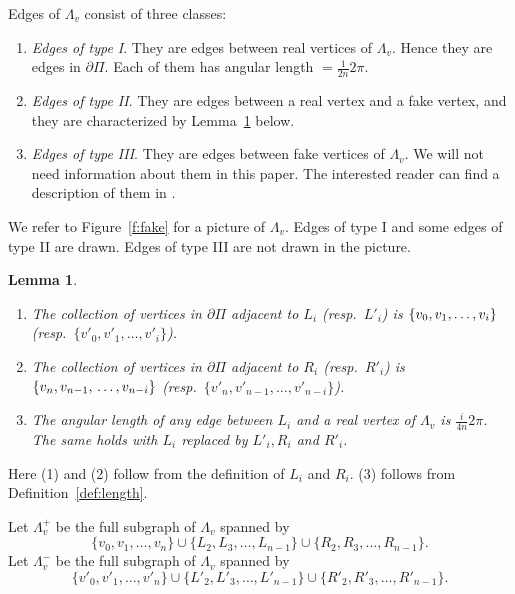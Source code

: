 \documentclass[11pt]{amsart}
\newtheorem{lemma}[theorem]{Lemma}
\theoremstyle{definition}
\newcommand{\lemfivefourteen}{Lemma 5.13}
\begin{document}
Edges of $\Lambda_v$ consist of three classes:
\begin{enumerate}
	\item \emph{Edges of type I}. They are edges between real vertices of $\Lambda_v$. Hence they are edges in $\partial\Pi$. Each of them has angular length $=\frac{1}{2n}2\pi$.
	\item \emph{Edges of type II}. They are edges between a real vertex and a fake vertex, and they are characterized by Lemma~\ref{lem:real fake} below.
	\item \emph{Edges of type III}. They are edges between fake vertices of $\Lambda_v$. We will not need information about them in this paper. The interested reader can find a description of them in \cite[\lemfivefourteen]{Artinmetric}.
\end{enumerate}
We refer to Figure~\ref{f:fake} for a picture of $\Lambda_v$. Edges of type I and some edges of type II are drawn. Edges of type III are not drawn in the picture.


\begin{lemma}\
	\label{lem:real fake}
	\begin{enumerate}
		\item The collection of vertices in $\partial\Pi$ adjacent to $L_i$ (resp.\ $L'_i$) is $\{v_0,v_1,\ldots,\\v_i\}$ (resp.\ $\{v'_0,v'_1,\ldots,v'_i\}$). 
		\item The collection of vertices in $\partial\Pi$ adjacent to $R_i$ (resp.\ $R'_i$) is $\{v_n,v_{n-1},\\ \ldots,v_{n-i}\}$ (resp.\ $\{v'_n,v'_{n-1},\ldots,v'_{n-i}\}$). 
		\item The angular length of any edge between $L_i$ and a real vertex of $\Lambda_v$ is $\frac{i}{4n}2\pi$. The same holds with $L_i$ replaced by $L'_i,R_i$ and $R'_i$.
	\end{enumerate}
\end{lemma}

Here (1) and (2) follow from the definition of $L_i$ and $R_i$. (3) follows from Definition~\ref{def:length}.

Let $\Lambda^+_v$ be the full subgraph of $\Lambda_v$ spanned by $$\{v_0,v_1,\ldots,v_n\}\cup \{L_2,L_3,\ldots,L_{n-1}\}\cup \{R_2,R_3,\ldots,R_{n-1}\}.$$ Let $\Lambda^-_v$ be the full subgraph of $\Lambda_v$ spanned by $$\{v'_0,v'_1,\ldots,v'_n\}\cup \{L'_2,L'_3,\ldots,L'_{n-1}\}\cup \{R'_2,R'_3,\ldots,R'_{n-1}\}.$$
\end{document}

